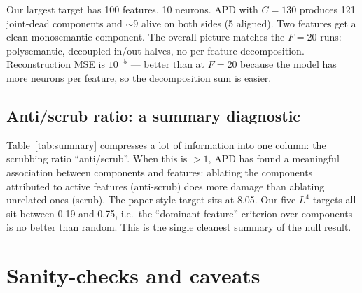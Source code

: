 \documentclass[11pt]{article}
\begin{document}
Our largest target has 100 features, 10 neurons. APD with $C=130$ produces
121 joint-dead components and $\sim 9$ alive on both sides (5 aligned).
Two features get a clean monosemantic component. The overall picture
matches the $F=20$ runs: polysemantic, decoupled in/out halves, no
per-feature decomposition. Reconstruction MSE is $10^{-5}$ — better than
at $F=20$ because the model has more neurons per feature, so the
decomposition sum is easier.

\subsection{Anti/scrub ratio: a summary diagnostic}

Table~\ref{tab:summary} compresses a lot of information into one column:
the scrubbing ratio ``anti/scrub''. When this is $> 1$, APD has found a
meaningful association between components and features: ablating the
components attributed to active features (anti-scrub) does more damage
than ablating unrelated ones (scrub). The paper-style target sits at
8.05. Our five $L^4$ targets all sit between 0.19 and 0.75, i.e.~the
``dominant feature'' criterion over components is no better than random.
This is the single cleanest summary of the null result.

\section{Sanity-checks and caveats}
\end{document}
